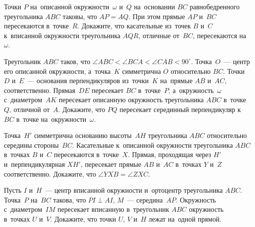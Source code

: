 \begin{problems}
\item
Точки $P$ на~описанной окружности~$\omega$ и~$Q$ на~основании $BC$
равнобедренного треугольника $ABC$ таковы, что $AP = AQ$.
При этом прямые $AP$ и~$BC$ пересекаются в~точке~$R$.
Докажите, что касательные из~точек $B$ и~$C$ к~вписанной окружности
треугольника $AQR$, отличные от~$BC$, пересекаются на~$\omega$.

\item
Треугольник $ABC$ таков, что
$\angle ABC < \angle BCA < \angle CAB < 90^{\circ}$.
Точка~$O$~--- центр его описанной окружности, а~точка~$K$ симметрична $O$
относительно $BC$.
Точки $D$ и~$E$~--- основания перпендикуляров из~точки~$K$
на~прямые $AB$ и~$AC$, соответственно.
Прямая~$DE$ пересекает $BC$ в~точке~$P$, а~окружность~$\omega$ с~диаметром~$AK$
пересекает описанную окружность треугольника $ABC$ в~точке~$Q$,
отличной от~$A$.
Докажите, что $PQ$ пересекает серединный перпендикуляр к~$BC$ в~точке
на~окружности~$\omega$.

\item
Точка~$H'$ симметрична основанию высоты~$AH$ треугольника $ABC$ относительно
середины стороны~$BC$.
Касательные к~описанной окружности треугольника $ABC$ в~точках $B$ и~$C$
пересекаются в~точке~$X$.
Прямая, проходящая через $H'$ и~перпендикулярная $XH'$, пересекает
прямые $AB$ и~$AC$ в~точках $Y$ и~$Z$ соответственно.
Докажите, что $\angle YXB = \angle ZXC$.

\item
Пусть $I$ и~$H$~--- центр вписанной окружности и~ортоцентр треугольника $ABC$.
Точка~$P$ на~$BC$ такова, что $PI \perp AI$, $M$~--- середина~$AP$.
Окружность с~диаметром~$IM$ пересекает вписанную в~треугольник $ABC$ окружность
в~точках $U$ и~$V$.
Докажите, что точки $U$, $V$ и~$H$ лежат на~одной прямой.

\end{problems}

